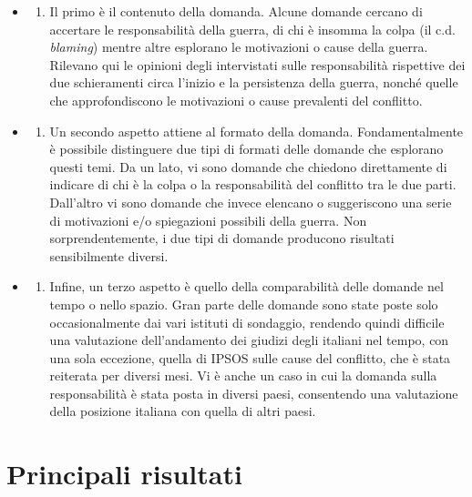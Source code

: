 \documentclass[
]{book}
\providecommand{\tightlist}{%
  \setlength{\itemsep}{0pt}\setlength{\parskip}{0pt}}
\begin{document}
\begin{itemize}
\item
  \begin{enumerate}
  \def\labelenumi{\alph{enumi})}
  \tightlist
  \item
    Il primo è il contenuto della domanda. Alcune domande cercano di accertare le responsabilità della guerra, di chi è insomma la colpa (il c.d. \emph{blaming}) mentre altre esplorano le motivazioni o cause della guerra. Rilevano qui le opinioni degli intervistati sulle responsabilità rispettive dei due schieramenti circa l'inizio e la persistenza della guerra, nonché quelle che approfondiscono le motivazioni o cause prevalenti del conflitto.
  \end{enumerate}
\item
  \begin{enumerate}
  \def\labelenumi{\alph{enumi})}
  \setcounter{enumi}{1}
  \tightlist
  \item
    Un secondo aspetto attiene al formato della domanda. Fondamentalmente è possibile distinguere due tipi di formati delle domande che esplorano questi temi. Da un lato, vi sono domande che chiedono direttamente di indicare di chi è la colpa o la responsabilità del conflitto tra le due parti. Dall'altro vi sono domande che invece elencano o suggeriscono una serie di motivazioni e/o spiegazioni possibili della guerra. Non sorprendentemente, i due tipi di domande producono risultati sensibilmente diversi.
  \end{enumerate}
\item
  \begin{enumerate}
  \def\labelenumi{\alph{enumi})}
  \setcounter{enumi}{2}
  \tightlist
  \item
    Infine, un terzo aspetto è quello della comparabilità delle domande nel tempo o nello spazio. Gran parte delle domande sono state poste solo occasionalmente dai vari istituti di sondaggio, rendendo quindi difficile una valutazione dell'andamento dei giudizi degli italiani nel tempo, con una sola eccezione, quella di IPSOS sulle cause del conflitto, che è stata reiterata per diversi mesi. Vi è anche un caso in cui la domanda sulla responsabilità è stata posta in diversi paesi, consentendo una valutazione della posizione italiana con quella di altri paesi.
  \end{enumerate}
\end{itemize}

\hypertarget{principali-risultati-1}{%
\section{Principali risultati}\label{principali-risultati-1}}
\end{document}

